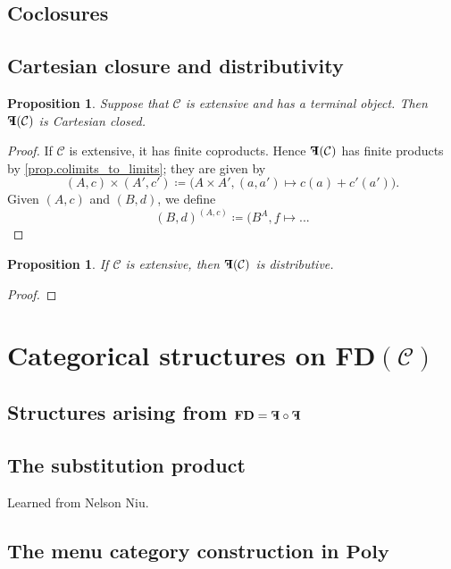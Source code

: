 \documentclass[11pt, one side, article]{memoir}
\theoremstyle{definition}
\theoremstyle{plain}
\newtheorem{proposition}[definitionx]{Proposition}
\newcommand{\cat}[1]{\mathcal{#1}}%
\newcommand{\Cat}[1]{\mathbf{#1}}%
\newcommand{\poly}{\Cat{Poly}}
\newcommand{\0}{\Cat{0}}
\newcommand{\1}{\Cat{1}}
\newcommand{\fd}{\Cat{FD}}
\newcommand{\mn}{\reflectbox{$\Cat{F}$}}
\begin{document}
\section{Coclosures}

\section{Cartesian closure and distributivity}

\begin{proposition}
Suppose that $\cat{C}$ is extensive and has a terminal object. Then $\mn(\cat{C})$ is Cartesian closed.
\end{proposition}
\begin{proof}
If $\cat{C}$ is extensive, it has finite coproducts. Hence $\mn(\cat{C})$ has finite products by \cref{prop.colimits_to_limits}; they are given by
\[
(A,c)\times (A',c')\coloneqq\big(A\times A', (a,a')\mapsto c(a)+c'(a')\big).
\]
Given $(A,c)$ and $(B,d)$, we define
\[
(B,d)^{(A,c)}\coloneqq(B^A, f\mapsto ...
\]
\end{proof}

\begin{proposition}
If $\cat{C}$ is extensive, then $\mn(\cat{C})$ is distributive.
\end{proposition}
\begin{proof}

\end{proof}

\chapter{Categorical structures on $\fd(\cat{C})$}
\section{Structures arising from $\fd=\mn\circ\mn$}
\section{The substitution product}

Learned from Nelson Niu.

\section{The menu category construction in $\poly$}



\printbibliography
\end{document}
